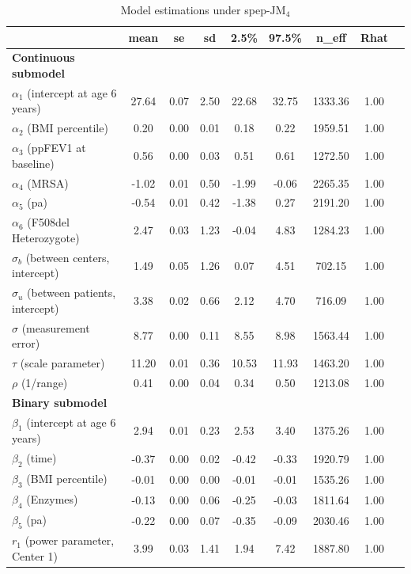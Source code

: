 \begin{center}
\begin{table}[ht]
   \caption{Model estimations under spep-$\mbox{JM}_4$} \label{tab:chp2_est}
   \centering
    \begin{threeparttable}
  \begin{tabular}{lcccccccc}
    \toprule
  & mean \tnote{1} & se \tnote{2} & sd \tnote{3} & 2.5\% \tnote{4} & 97.5\% \tnote{4} & n\_eff \tnote{5} & Rhat \tnote{6}\\
 \midrule
   \textbf{Continuous submodel} &&&&&&& \\
   \midrule
    $\alpha_1$ (intercept at age 6 years) & 27.64&0.07&2.50&22.68&32.75&1333.36&1.00\\
    $\alpha_2$ (BMI percentile) & 0.20&0.00&0.01&0.18&0.22&1959.51&1.00\\
    $\alpha_3$ (ppFEV1 at baseline) & 0.56&0.00&0.03&0.51&0.61&1272.50&1.00\\
    $\alpha_4$ (MRSA) & -1.02&0.01&0.50&-1.99&-0.06&2265.35&1.00\\
    $\alpha_5$ (pa) & -0.54&0.01&0.42&-1.38&0.27&2191.20&	1.00\\
    $\alpha_6$ (F508del Heterozygote) & 2.47&0.03&1.23&-0.04&4.83&1284.23&1.00\\
    $\sigma_b$ (between centers, intercept) & 1.49&0.05&1.26&0.07&4.51&702.15&1.00\\
    $\sigma_u$ (between patients, intercept) & 3.38&0.02&0.66&2.12&4.70&716.09&1.00 \\
    $\sigma$ (measurement error) & 8.77&0.00&0.11&8.55&8.98&1563.44&1.00\\
    $\tau$ (scale parameter) & 11.20&0.01&0.36&10.53&11.93&1463.20&1.00\\
    $\rho$ (1/range)& 0.41&0.00&0.04&0.34&0.50&1213.08&1.00\\
  \midrule
  \textbf{Binary submodel} &&&&&&& \\
   \midrule
    $\beta_1$ (intercept at age 6 years) & 2.94&0.01&0.23&2.53&3.40&1375.26&1.00\\
    $\beta_2$ (time) & -0.37&0.00&0.02&-0.42&-0.33&1920.79&1.00\\
    $\beta_3$ (BMI percentile) & -0.01&0.00&0.00&-0.01&-0.01&1535.26&1.00\\
    $\beta_4$ (Enzymes) & -0.13&0.00&0.06&-0.25&-0.03&1811.64&1.00\\
    $\beta_5$ (pa) & -0.22&0.00&0.07&-0.35&-0.09&2030.46&1.00\\
    $r_1$ (power parameter, Center 1) &3.99	&0.03&1.41&1.94&7.42&1887.80&1.00\\

\end{tabular}
\end{threeparttable}
\end{table}
\end{center}
